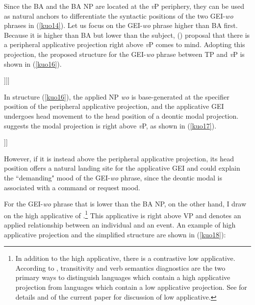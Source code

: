 \documentclass[output=paper,colorlinks,citecolor=brown]{langscibook}
\begin{document}
Since the BA and the BA NP are located at the \textit{v}P periphery, they can be used as natural anchors to differentiate the syntactic positions of the two GEI-\textit{wo} phrases in (\ref{kuo14}). Let us focus on the GEI-\textit{wo} phrase higher than BA first. Because it is higher than BA but lower than the subject,  (\citeyear{kim2011, kim2012}) proposal that there is a peripheral applicative projection right above \textit{v}P comes to mind. Adopting this projection, the proposed structure for the GEI-\textit{wo} phrase between TP and \textit{v}P is shown in (\ref{kuo16}).

\ea
\label{kuo16}
\glt [\textsubscript{TP} Ni\textsubscript{i}  [\textsubscript{MP\textsubscript{Deo}}  gei\textsubscript{j}  [\textsubscript{peripheral ApplP}  wo  t\textsubscript{j}  [\textsubscript{\textit{v}P}  t\textsubscript{i}  ......]]]]\\  
\z

In structure (\ref{kuo16}), the applied NP \textit{wo} is base-generated at the specifier position of the peripheral applicative projection, and the applicative GEI undergoes head movement to the head position of a deontic modal projection. \citet{Tsai2015a} suggests the modal projection is right above \textit{v}P, as shown in (\ref{kuo17}).

\ea
\label{kuo17}
\glt [\textsubscript{TP} Subject\textsubscript{i}..... [\textsubscript{MP\textsubscript{Deo}}   Deontic modal  [\textsubscript{\textit{v}P}  t\textsubscript{i}  ......]]]\\  
\z

However, if it is instead above the peripheral applicative projection, its head position offers a natural landing site for the applicative GEI and could explain the ``demanding" mood of the GEI-\textit{wo} phrase, since the deontic modal is associated with a command or request mood.

For the GEI-\textit{wo} phrase that is lower than the BA NP, on the other hand, I draw on the high applicative of \citet{Pylkkanen2002, Pylkkanen2008}.\footnote{In addition to the high applicative, there is a contrastive low applicative. According to \citet{Pylkkanen2002}, transitivity and verb semantics diagnostics are the two primary ways to distinguish languages which contain a high applicative projection from languages which contain a low applicative projection. See \citet{Pylkkanen2002, Pylkkanen2008} for details and  of the current paper for discussion of  low applicative.} This applicative is right above VP and denotes an applied relationship between an individual and an event. An example of  high applicative projection and the simplified structure are shown in (\ref{kuo18}):
\end{document}
